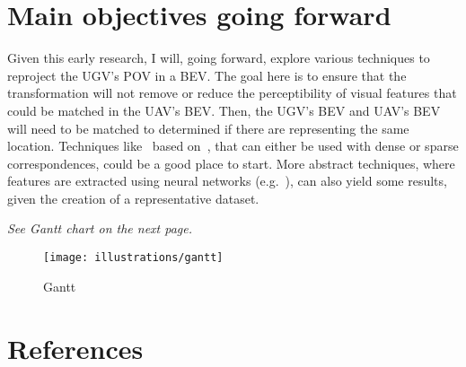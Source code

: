 \documentclass[11pt, a4paper]{article}
\begin{document}
    \section{Main objectives going forward}\label{sec:main-objectives-going-forward}

    Given this early research, I will, going forward, explore various techniques to reproject the UGV's POV in a BEV.
    The goal here is to ensure that the transformation will not remove or reduce the perceptibility of visual
    features that could be matched in the UAV's BEV.
    Then, the UGV's BEV and UAV's BEV will need to be matched to determined if there are representing the same
    location.
    Techniques like~\cite{comport_accurate_2007} based on~\cite{comport_statistically_2006}, that can either be used
    with dense or sparse correspondences, could be a good place to start.
    More abstract techniques, where features are extracted using neural networks (e.g.~\cite{zhang_dual-bev_2025}),
    can also yield some results, given the creation of a representative dataset.

    \textit{See Gantt chart on the next page.}

    \newpage


    \begin{figure}[!ht]
        \centering
        \texttt{[image: illustrations/gantt]}
        \caption{Gantt}
        \label{fig:gantt}
    \end{figure}
    \FloatBarrier

    \newpage


    \section{References}\label{sec:references}

    \printbibliography[heading=none]
\end{document}
